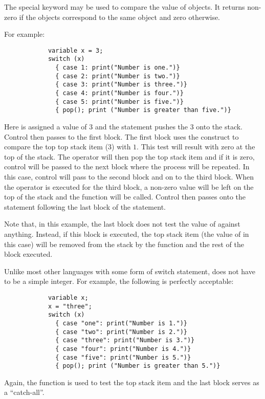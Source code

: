         The special keyword   may be used to compare the value of
        objects.   It  returns non-zero if the objects correspond to the
        same object and zero otherwise.
        
        For example:
\begin{verbatim}
            variable x = 3;
            switch (x)
              { case 1: print("Number is one.")}
              { case 2: print("Number is two.")}
              { case 3: print("Number is three.")}
              { case 4: print("Number is four.")}
              { case 5: print("Number is five.")}
              { pop(); print ("Number is greater than five.")}
\end{verbatim}
        Here  is assigned a value of $3$ and the 
	statement pushes the $3$ onto the stack.  Control then passes to the
	first block.  The first block uses the  construct to
	compare the top top stack item ($3$) with $1$. This test will result
	with zero at the top of the stack. The \var{:} operator will then
	pop the top stack item and if it is zero, control will be passed to
	the next block where the process will be repeated.  In this case,
	control will pass to the second block and on to the third block.
	When the \var{:} operator is executed for the third block, a
	non-zero value will be left on the top of the stack and the
	 function will be called. Control then passes onto the
	statement following the last block of the  statement.

        Note that, in this example, the last block does not test the value
	of  against anything. Instead, if this block is executed, the
	top stack item (the value of  in this case) will be removed
	from the stack by the  function and the rest of the block
	executed.

        Unlike most other languages with some form of switch statement, 
        does not have to be a simple integer.  For example, the following is
        perfectly acceptable:
\begin{verbatim}
            variable x;
            x = "three";
            switch (x)
              { case "one": print("Number is 1.")}
              { case "two": print("Number is 2.")}
              { case "three": print("Number is 3.")}
              { case "four": print("Number is 4.")}
              { case "five": print("Number is 5.")}
              { pop(); print ("Number is greater than 5.")}
\end{verbatim}
        Again, the  function is used to test the top stack item and
        the last block serves as a ``catch-all''.
        


